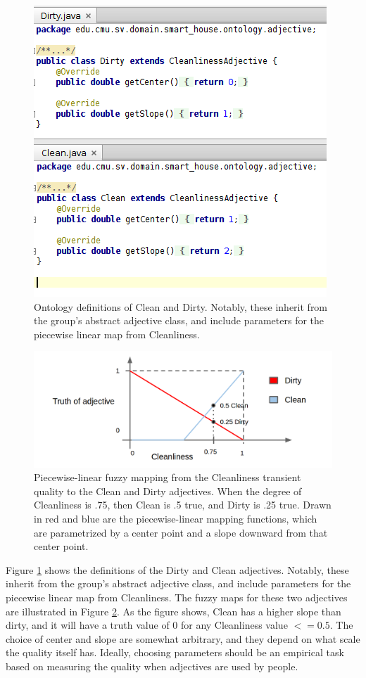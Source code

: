 \documentclass[titlepage]{article}
\begin{document}
\begin{figure}[h!]
\centering
\includegraphics[width=.6\textwidth]{CleanAndDirty}
\caption{Ontology definitions of Clean and Dirty.
Notably, these inherit from the group's abstract adjective class, and include parameters for the piecewise linear map from Cleanliness.}
\label{fig:clean_and_dirty_definition}
\end{figure}


\begin{figure}[h!]
\centering
\includegraphics[width=\textwidth]{CleanDirtyFuzzyMap}
\caption{Piecewise-linear fuzzy mapping from the Cleanliness transient quality to the Clean and Dirty adjectives. 
When the degree of Cleanliness is .75, then Clean is .5 true, and Dirty is .25 true.
Drawn in red and blue are the piecewise-linear mapping functions, which are parametrized by a center point and a slope downward from that center point.}
\label{fig:clean_dirty_fuzzy_map}
\end{figure}

Figure \ref{fig:clean_and_dirty_definition} shows the definitions of the Dirty and Clean adjectives.
Notably, these inherit from the group's abstract adjective class, and include parameters for the piecewise linear map from Cleanliness.
The fuzzy maps for these two adjectives are illustrated in Figure \ref{fig:clean_dirty_fuzzy_map}.
As the figure shows, Clean has a higher slope than dirty, and it will have a truth value of $0$ for any Cleanliness value $<= 0.5$.
The choice of center and slope are somewhat arbitrary, and they depend on what scale the quality itself has.
Ideally, choosing parameters should be an empirical task based on measuring the quality when adjectives are used by people.
\end{document}
